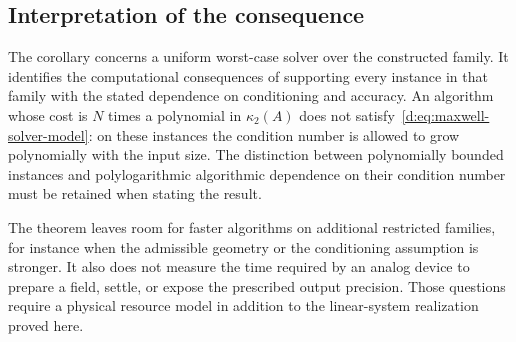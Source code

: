 \subsection{Interpretation of the consequence}

The corollary concerns a uniform worst-case solver over the constructed
family. It identifies the computational consequences of supporting every
instance in that family with the stated dependence on conditioning and
accuracy. An algorithm whose cost is $N$ times a polynomial in
$\kappa_2(A)$ does not satisfy~\eqref{d:eq:maxwell-solver-model}: on these
instances the condition number is allowed to grow polynomially with the
input size. The distinction between polynomially bounded instances and
polylogarithmic algorithmic dependence on their condition number must be
retained when stating the result.

The theorem leaves room for faster algorithms on additional restricted
families, for instance when the admissible geometry or the conditioning
assumption is stronger. It also does not measure the time required by an
analog device to prepare a field, settle, or expose the prescribed output
precision. Those questions require a physical resource model in addition
to the linear-system realization proved here.
